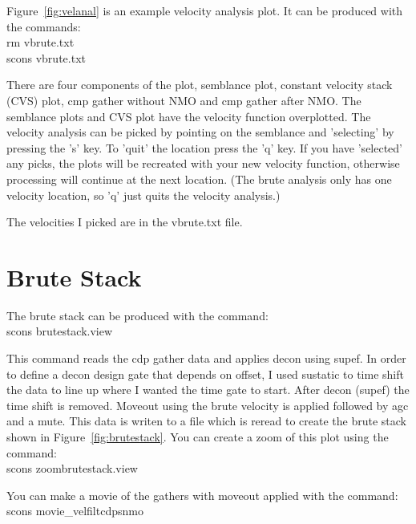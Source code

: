 Figure~\ref{fig:velanal} is an example velocity analysis plot.  It can 
be produced with the commands: \\
rm vbrute.txt \\
scons vbrute.txt

There are four components of the plot, semblance plot, constant velocity 
stack (CVS) plot, cmp gather without NMO and cmp gather after NMO.  The 
semblance plots and CVS plot have the velocity function overplotted.  
The velocity analysis can be picked by pointing on the semblance and 
'selecting' by pressing the 's' key.  To 'quit' the location press the 
'q' key.  If you have 'selected' any picks, the plots will be recreated 
with your new velocity function, otherwise processing will continue at 
the next location.  (The brute analysis only has one velocity location, 
so 'q' just quits the velocity analysis.)

The velocities I picked are in the vbrute.txt file.


\section{Brute Stack}
The brute stack can be produced with the command: \\
scons brutestack.view

This command reads the cdp gather data and applies decon using supef.  In 
order to define a decon design gate that depends on offset, I used sustatic 
to time shift the data to line up where I wanted the time gate to start.  
After decon (supef) the time shift is removed.  Moveout using the brute 
velocity is applied followed by agc and a mute.  This data is writen to a 
file which is reread to create the brute stack shown in 
Figure~\ref{fig:brutestack}.  You can create a zoom of this plot using the 
command:\\
scons zoombrutestack.view

You can make a movie of the gathers with moveout applied with the command: \\
scons movie\_velfiltcdpsnmo


